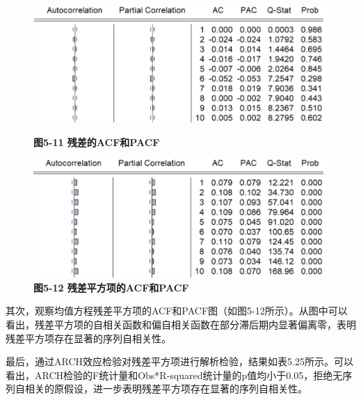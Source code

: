 \documentclass[12pt, a4paper]{article}
\numberwithin{equation}{section}
\begin{document}
\begin{figure}[h!]
    \centering
    \captionsetup{labelformat=simple}
    \begin{minipage}[b]{0.45\textwidth}
        \includegraphics[width=\textwidth]{./img/r.png}
        \captionsetup{labelformat=empty}
        \caption{\textbf{\fontsize{9pt}{11pt}\selectfont 图5-11 残差的ACF和PACF}}
    \end{minipage}
    \hfill
    \begin{minipage}[b]{0.45\textwidth}
        \includegraphics[width=\textwidth]{./img/r2.png}
        \captionsetup{labelformat=empty}
        \caption{\textbf{\fontsize{9pt}{11pt}\selectfont 图5-12 残差平方项的ACF和PACF}}
    \end{minipage}
    \captionsetup{labelformat=empty}
\end{figure}


其次，观察均值方程残差平方项的ACF和PACF图（如图5-12所示）。从图中可以看出，残差平方项的自相关函数和偏自相关函数在部分滞后期内显著偏离零，表明残差平方项存在显著的序列自相关性。

最后，通过ARCH效应检验对残差平方项进行解析检验，结果如表5.25所示。可以看出，ARCH检验的F统计量和Obs*R-squared统计量的p值均小于0.05，拒绝无序列自相关的原假设，进一步表明残差平方项存在显著的序列自相关性。
\end{document}
